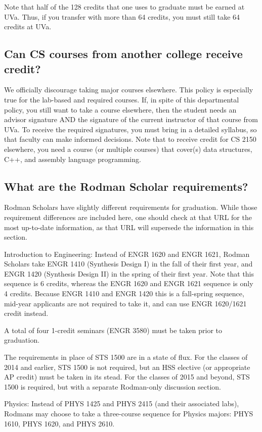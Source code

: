 Note that half of the 128 credits that one uses to graduate must be
earned at UVa. Thus, if you transfer with more than 64 credits, you
must still take 64 credits at UVa.

\subsection{Can CS courses from another college receive credit?}

We officially discourage taking major courses elsewhere. This policy
is especially true for the lab-based and required courses. If, in
spite of this departmental policy, you still want to take a course
elsewhere, then the student needs an advisor signature AND the
signature of the current instructor of that course from UVa. To
receive the required signatures, you must bring in a detailed
syllabus, so that faculty can make informed decisions. Note that to
receive credit for CS 2150 elsewhere, you need a course (or
multiple courses) that cover(s) data structures, C++, and assembly
language programming.

\subsection{What are the Rodman Scholar requirements?}

Rodman Scholars have
slightly different
requirements
for graduation.  While those requirement differences are included
here, one should check at that URL for the
most up-to-date information, as that URL will supersede the
information in this section.

\begin{itemlist}
\item Introduction to Engineering: Instead of ENGR 1620 and ENGR 1621,
  Rodman Scholars take ENGR 1410 (Synthesis Design I) in the fall of
  their first year, and ENGR 1420 (Synthesis Design II) in the spring
  of their first year.  Note that this sequence is 6 credits, whereas
  the ENGR 1620 and ENGR 1621 sequence is only 4 credits.  Because
  ENGR 1410 and ENGR 1420 this is a fall-spring sequence, mid-year
  applicants are not required to take it, and can use ENGR 1620/1621
  credit instead.
\item A total of four 1-credit seminars (ENGR 3580) must be taken
  prior to graduation.
\item The requirements in place of STS 1500 are in a state of flux.
  For the classes of 2014 and earlier, STS 1500 is not required, but
  an HSS elective (or appropriate AP credit) must be taken in its
  stead.  For the classes of 2015 and beyond, STS 1500 is required,
  but with a separate Rodman-only discussion section.
\item Physics: Instead of PHYS 1425 and PHYS 2415 (and their
  associated labs), Rodmans may choose
  to take a three-course sequence for Physics majors: PHYS 1610, PHYS
  1620, and PHYS 2610.
\end{itemlist}

